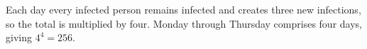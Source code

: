Each day every infected person remains infected and creates three new infections, so the total is multiplied by four. Monday through Thursday comprises four days, giving $4^4=\boxed{256}$.
